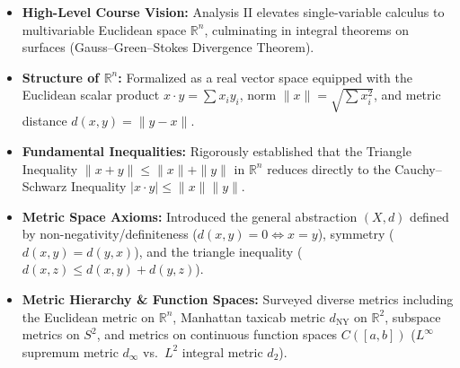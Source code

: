 \begin{nice-box}
\begin{itemize}
    \item \textbf{High-Level Course Vision:} Analysis II elevates single-variable calculus to multivariable Euclidean space $\mathbb{R}^n$, culminating in integral theorems on surfaces (Gauss--Green--Stokes Divergence Theorem).
    \item \textbf{Structure of $\mathbb{R}^n$:} Formalized as a real vector space equipped with the Euclidean scalar product $x \cdot y = \sum x_i y_i$, norm $\|x\| = \sqrt{\sum x_i^2}$, and metric distance $d(x, y) = \|y - x\|$.
    \item \textbf{Fundamental Inequalities:} Rigorously established that the Triangle Inequality $\|x + y\| \le \|x\| + \|y\|$ in $\mathbb{R}^n$ reduces directly to the Cauchy--Schwarz Inequality $|x \cdot y| \le \|x\| \|y\|$.
    \item \textbf{Metric Space Axioms:} Introduced the general abstraction $(X, d)$ defined by non-negativity/definiteness ($d(x, y) = 0 \iff x = y$), symmetry ($d(x, y) = d(y, x)$), and the triangle inequality ($d(x, z) \le d(x, y) + d(y, z)$).
    \item \textbf{Metric Hierarchy \& Function Spaces:} Surveyed diverse metrics including the Euclidean metric on $\mathbb{R}^n$, Manhattan taxicab metric $d_{\text{NY}}$ on $\mathbb{R}^2$, subspace metrics on $S^2$, and metrics on continuous function spaces $C([a, b])$ ($L^\infty$ supremum metric $d_\infty$ vs.\ $L^2$ integral metric $d_2$).
\end{itemize}
\end{nice-box}

